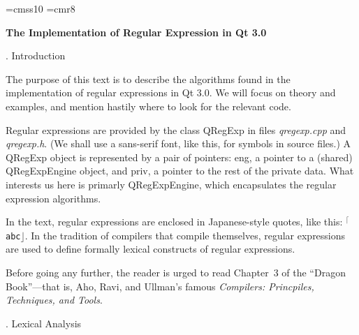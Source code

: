 


\font\sf=cmss10
\font\eightrm=cmr8

\def\rx#1{{$^{\scriptscriptstyle\lceil}$\tt#1$\scriptscriptstyle\rfloor$}}

\def\<#1>{\leavevmode\hbox{$\langle$#1\/$\rangle$}}
\def\tok#1{\leavevmode\hbox{\eightrm\uppercase{#1}}}
\def\\{\char`\\}
\def\^{\char`\^}
\def\lex#1{\leavevmode\hbox{\tt#1}}
\let\is=\longrightarrow
\let\alt=\mid

\def\f#1{\strut\enskip#1\hfil\enskip}
\def\g#1{\strut\enskip\hfil#1\hfil\enskip}
\def\x{\phantom{+}}
\def\haha{$\hat a$}

\centerline{\bf The Implementation of Regular Expression in Qt 3.0}
\smallskip

. Introduction

The purpose of this text is to describe the algorithms found in the implementation of regular expressions in Qt 3.0.  We will focus on theory and examples, and mention hastily where to look for the relevant code.

Regular expressions are provided by the class {\sf QRegExp} in files {\it qregexp.cpp} and {\it qregexp.h}.  (We shall use a sans-serif font, {\sf like this}, for symbols in source files.)  A {\sf QRegExp} object is represented by a pair of pointers:  {\sf eng}, a pointer to a (shared) {\sf QRegExpEngine} object, and {\sf priv}, a pointer to the rest of the private data.  What interests us here is primarly {\sf QRegExpEngine}, which encapsulates the regular expression algorithms.

In the text, regular expressions are enclosed in Japanese-style quotes, like this: \rx{abc}.  In the tradition of compilers that compile themselves, regular expressions are used to define formally lexical constructs of regular expressions.

Before going any further, the reader is urged to read Chapter~3 of the ``Dragon Book''---that is, Aho, Ravi, and Ullman's famous {\sl Compilers: Princpiles, Techniques, and Tools}.

. Lexical Analysis

